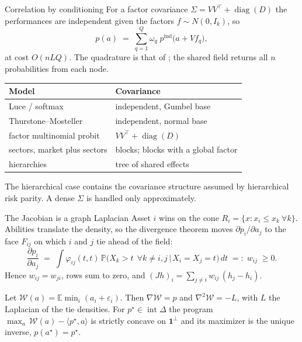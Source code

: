 \documentclass[aspectratio=169,11pt]{beamer}
\newcommand{\E}{\mathbb{E}}
\newcommand{\Prob}{\mathbb{P}}
\newcommand{\one}{\mathbf{1}}
\begin{document}
\begin{frame}{Correlation by conditioning}
For a factor covariance $\Sigma = VV^\top + \operatorname{diag}(D)$ the
performances are independent given the factors $f\sim N(0,I_k)$, so
\[
  p(a) \;=\; \sum_{q=1}^{Q} \omega_q\; p^{\mathrm{ind}}\big(a + V f_q\big),
\]
at cost $O(nLQ)$. The quadrature is that of \textcite{butler1982}; the shared
field returns all $n$ probabilities from each node.

\small
\begin{tabular}{@{}ll@{}}
  \toprule
  Model & Covariance \\
  \midrule
  Luce / softmax & independent, Gumbel base \\
  Thurstone--Mosteller & independent, normal base \\
  factor multinomial probit & $VV^\top+\operatorname{diag}(D)$ \\
  sectors, market plus sectors & blocks; blocks with a global factor \\
  hierarchies & tree of shared effects \\
  \bottomrule
\end{tabular}

\normalsize
The hierarchical case contains the covariance structure assumed by hierarchical
risk parity. A dense $\Sigma$ is handled only approximately.
\end{frame}

\begin{frame}{The Jacobian is a graph Laplacian}
Asset $i$ wins on the cone $R_i=\{x: x_i\le x_k\ \forall k\}$. Abilities
translate the density, so the divergence theorem moves
$\partial p_i/\partial a_j$ to the face $F_{ij}$ on which $i$ and $j$ tie ahead
of the field:
\[
  \frac{\partial p_i}{\partial a_j}
  \;=\; \int \varphi_{ij}(t,t)\,
        \Prob\big(X_k>t\ \ \forall k\ne i,j \,\big|\, X_i=X_j=t\big)\,dt
  \;=:\; w_{ij} \;\ge 0 .
\]
Hence $w_{ij}=w_{ji}$, rows sum to zero, and
$(Jh)_i=\sum_{j\ne i} w_{ij}\,(h_j-h_i)$.

\begin{theorem}[Cotton 2026]
Let $\mathcal W(a)=\E\min_i(a_i+\varepsilon_i)$. Then $\nabla \mathcal W = p$ and
$\nabla^2 \mathcal W=-L$, with $L$ the Laplacian of the tie densities.
For $p^\star\in\operatorname{int}\Delta$ the program
$\max_a\,\mathcal W(a)-\langle p^\star,a\rangle$ is strictly concave on
$\one^{\perp}$ and its maximizer is the unique inverse, $p(a^\star)=p^\star$.
\end{theorem}
\end{frame}
\end{document}
